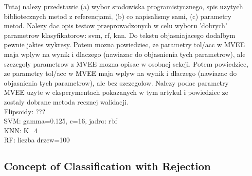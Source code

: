 \documentclass{llncs}
\begin{document}
{\color{red}Tutaj nalezy przedstawic (a) wybor srodowiska programistycznego, spis uzytych bibliotecznych metod z referencjami, (b) co napisalismy sami, (c) parametry metod. Nalezy dac opis testow przeprowadzonych w celu wyboru 'dobrych' parametrow klasyfikatorow: svm, rf, knn. Do tekstu objasniajacego dodalbym pewnie jakies wykresy. Potem mozna powiedziec, ze parametry tol/acc w MVEE maja wplyw na wynik i dlaczego (nawiazac do objasnienia tych parametrow), ale szczegoly parametrow z MVEE mozna opisac w osobnej sekcji.}
{\color{blue} Potem powiedziec, ze parametry tol/acc w MVEE maja wplyw na wynik i dlaczego (nawiazac do objasnienia tych parametrow), ale bez szczegolow. Nalezy podac parametry MVEE uzyte w eksperymentach pokazanych w tym artykul i powiedziec ze zostaly dobrane metoda recznej walidacji.}\\
{\color{green}Elipsoidy: ??? \\SVM: gamma=0.125, c=16, jadro: rbf\\
KNN: K=4\\
RF: liczba drzew=100}


\subsection{Concept of Classification with Rejection}
  \label{subsec:ClassificationAndRejection}
\end{document}
